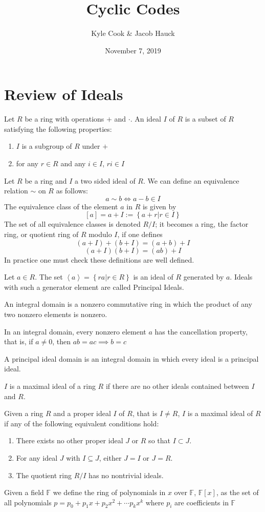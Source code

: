 \documentclass[letterpaper, 12pt]{article}
\title{Cyclic Codes}
\author{Kyle Cook \& Jacob Hauck}
\date{November 7, 2019}
\begin{document}
\maketitle

\section{Review of Ideals}
 Let $R$ be a ring with operations $+$ and $\cdot$. An ideal $I$ of $R$ is a subset of $R$ satisfying the following properties:
  \begin{enumerate}
    \item $I$ is a subgroup of $R$ under $+$
    \item for any $r\in R$ and any $i\in I$, $ri\in I$
  \end{enumerate}
 Let $R$ be a ring and $I$ a two sided ideal of $R$.  We can define an equivalence relation $\sim$ on $R$ as follows:
\[a\sim b \iff a-b \in I\]
The equivalence class of the element $a$ in $R$ is given by
\[\left[a\right] = a + I := \left\{a + r | r \in I\right\}\]
The set of all equivalence classes is denoted $R/I$; it becomes a ring, the factor ring, or quotient ring of $R$ modulo $I$, if one defines
\[(a+I) + (b+I) = (a+b) + I\]
\[(a+I)(b+I) = (ab) + I\]
In practice one must check these definitions are well defined.

 Let $a\in R$.  The set $\left<a\right> = \left\{ra | r \in R\right\}$ is an ideal of $R$ generated by $a$.  Ideals with such a generator element are called Principal Ideals.

 An integral domain is a nonzero commutative ring in which the product of any two nonzero elements is nonzero.

\theorem In an integral domain, every nonzero element $a$ has the cancellation property, that is, if $a\neq0$, then $ab=ac \implies b=c$

 A principal ideal domain is an integral domain in which every ideal is a principal ideal.

 $I$ is a maximal ideal of a ring $R$ if there are no other ideals contained between $I$ and $R$.

\theorem Given a ring $R$ and a proper ideal $I$ of $R$, that is $I\neq R$, $I$ is a maximal ideal of $R$ if any of the following equivalent conditions hold:
\begin{enumerate}
  \item There exists no other proper ideal $J$ or $R$ so that $I \subset J$.
  \item For any ideal $J$ with $I\subseteq J$, either $J=I$ or $J=R$.
  \item The quotient ring $R/I$ has no nontrivial ideals.
\end{enumerate}

 Given a field $\mathbb{F}$ we define the ring of polynomials in $x$ over $\mathbb{F}$, $\mathbb{F}[x]$, as the set of all polynomials $p = p_0 + p_1x + p_2x^2 + \cdots p_kx^k$ where $p_i$ are coefficients in $\mathbb{F}$
\end{document}
